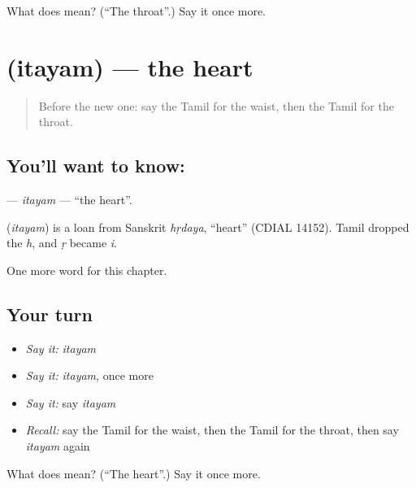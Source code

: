 \begin{tcolorbox}[breakable,colback=teal!4,colframe=teal!35!black,title={Before you move on}]
What does  mean? (\textquotedblleft{}The throat\textquotedblright{}.) Say it once more.
\end{tcolorbox}
\section[\texorpdfstring{\ta{இதயம்} (itayam)}{இதயம் (itayam)}]{ (itayam) — the heart}

\label{lesson:TA-C169-itayam}



\begin{quote}
Before the new one: say the Tamil for the waist, then the Tamil for the throat.
\end{quote}

\subsection*{You'll want to know: }
\textbf{} — \emph{itayam} — \textquotedblleft{}the heart\textquotedblright{}.

\begin{cousinweb}
\textbf{} (\emph{itayam}) is a loan from Sanskrit \emph{hṛdaya}, \textquotedblleft{}heart\textquotedblright{} (CDIAL 14152). Tamil dropped the \emph{h}, and \emph{ṛ} became \emph{i}.
\end{cousinweb}

\begin{grammarlens}[title={What you've built}]
One more word for this chapter.
\end{grammarlens}

\subsection*{Your turn}
\begin{itemize}
\raggedright
  \item \emph{Say it:} \emph{itayam}
  \item \emph{Say it:} \emph{itayam}, once more
  \item \emph{Say it:} say \emph{itayam}
  \item \emph{Recall:} say the Tamil for the waist, then the Tamil for the throat, then say \emph{itayam} again
\end{itemize}

\begin{tcolorbox}[breakable,colback=teal!4,colframe=teal!35!black,title={Before you move on}]
What does  mean? (\textquotedblleft{}The heart\textquotedblright{}.) Say it once more.
\end{tcolorbox}
